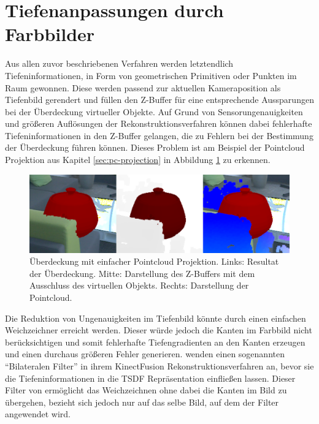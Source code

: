 \section{Tiefenanpassungen durch Farbbilder}

Aus allen zuvor beschriebenen Verfahren werden letztendlich Tiefeninformationen, in Form von geometrischen Primitiven oder Punkten im Raum gewonnen. Diese werden passend zur aktuellen Kameraposition als Tiefenbild gerendert und füllen den Z-Buffer für eine entsprechende Aussparungen bei der Überdeckung virtueller Objekte. Auf Grund von Sensorungenauigkeiten und größeren Auflösungen der Rekonstruktionsverfahren können dabei fehlerhafte Tiefeninformationen in den Z-Buffer gelangen, die zu Fehlern bei der Bestimmung der Überdeckung führen können. Dieses Problem ist am Beispiel der Pointcloud Projektion aus Kapitel \ref{sec:pc-projection} in Abbildung \ref{fig:pc-noise} zu erkennen. 

\begin{figure}[h]
  \centering
	\includegraphics[width=1.0\textwidth]{content/images/methods/pc-noise.png} 
  \caption{Überdeckung mit einfacher Pointcloud Projektion. Links: Resultat der Überdeckung. Mitte: Darstellung des Z-Buffers mit dem Ausschluss des virtuellen Objekts. Rechts: Darstellung der Pointcloud.}
  \label{fig:pc-noise}
\end{figure}

Die Reduktion von Ungenauigkeiten im Tiefenbild könnte durch einen einfachen Weichzeichner erreicht werden. Dieser würde jedoch die Kanten im Farbbild nicht berücksichtigen und somit fehlerhafte Tiefengradienten an den Kanten erzeugen und einen durchaus größeren Fehler generieren. \citet{newcombe2011kinectfusion} wenden einen sogenannten \enquote{Bilateralen Filter} in ihrem KinectFusion Rekonstruktionsverfahren an, bevor sie die Tiefeninformationen in die TSDF Repräsentation einfließen lassen. Dieser Filter von \citet{tomasi1998bilateral} ermöglicht das Weichzeichnen ohne dabei die Kanten im Bild zu übergehen, bezieht sich jedoch nur auf das selbe Bild, auf dem der Filter angewendet wird. 

